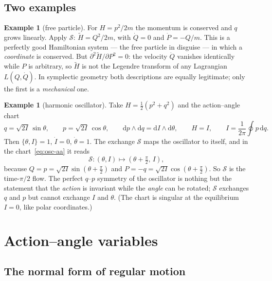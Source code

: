 \documentclass[11pt,a4paper]{article}
\theoremstyle{definition}
\newtheorem{example}[theorem]{Example}
\theoremstyle{remark}
\newcommand{\dd}{\mathrm{d}}
\newcommand{\PB}[2]{\{#1,#2\}}
\newcommand{\Sw}{\mathcal{S}}
\begin{document}
\subsection{Two examples}

\begin{example}[free particle]\label{ex:free}
For $H=p^2/2m$ the momentum is conserved and $q$ grows linearly. Apply $\Sw$: $\tilde H=Q^2/2m$, with $\dot Q=0$ and $\dot P=-Q/m$. This is a perfectly good Hamiltonian system --- the free particle in disguise --- in which a \emph{coordinate} is conserved. But $\partial^2\tilde H/\partial P^2=0$: the velocity $\dot Q$ vanishes identically while $P$ is arbitrary, so $\tilde H$ is not the Legendre transform of any Lagrangian $L(Q,\dot Q)$. In symplectic geometry both descriptions are equally legitimate; only the first is a \emph{mechanical} one.
\end{example}

\begin{example}[harmonic oscillator]\label{ex:osc}
Take $H=\tfrac12(p^2+q^2)$ and the action--angle chart
\begin{equation}\label{eq:osc-aa}
q=\sqrt{2I}\,\sin\theta,\qquad p=\sqrt{2I}\,\cos\theta,\qquad
\dd p\wedge\dd q=\dd I\wedge\dd\theta,\qquad H=I,\qquad I=\frac1{2\pi}\oint p\,\dd q .
\end{equation}
Then $\PB\theta I=1$, $\dot I=0$, $\dot\theta=1$. The exchange $\Sw$ maps the oscillator to itself, and in the chart~\eqref{eq:osc-aa} it reads
\[
\Sw:(\theta,I)\longmapsto(\theta+\tfrac\pi2,\,I),
\]
because $Q=p=\sqrt{2I}\sin(\theta+\tfrac\pi2)$ and $P=-q=\sqrt{2I}\cos(\theta+\tfrac\pi2)$. So $\Sw$ is the time-$\pi/2$ flow. The perfect $q$--$p$ symmetry of the oscillator is nothing but the statement that the \emph{action} is invariant while the \emph{angle} can be rotated; $\Sw$ exchanges $q$ and $p$ but cannot exchange $I$ and $\theta$. (The chart is singular at the equilibrium $I=0$, like polar coordinates.)
\end{example}

\section{Action--angle variables}

\subsection{The normal form of regular motion}
\end{document}
